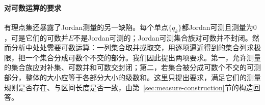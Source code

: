 \paragraph{对可数运算的要求}
有理点集还暴露了Jordan测量的另一缺陷。每个单点$\{q_k\}$都Jordan可测且测量为$0$，可是它们的可数并$E$不是Jordan可测的；Jordan可测集合族对可数并不封闭。然而分析中处处需要可数运算：一列集合取并或取交，用逐项逼近得到的集合列求极限，把一个集合分成可数个不交的部分。我们因此提出两项要求。第一，允许测量的集合族应对补集、可数并和可数交封闭；第二，若集合被分成可数个不交的可测部分，整体的大小应等于各部分大小的级数和。这里只提出要求，满足它们的测量规则是否存在、与区间长度是否一致，由第~\ref{sec:measure-construction}节的构造回答。
